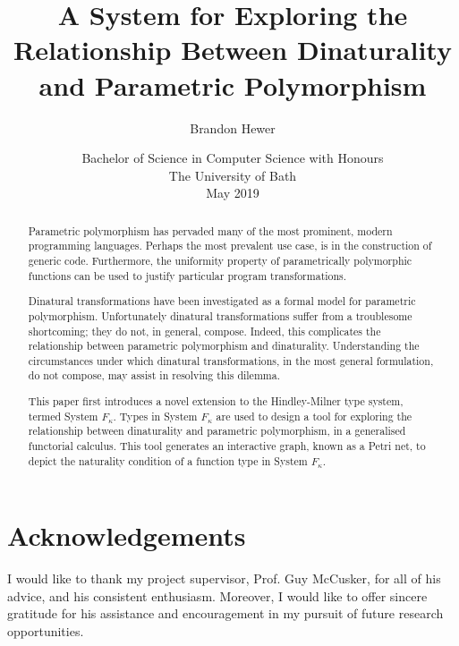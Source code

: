 \documentclass[11pt,openright,hidelinks,a4paper]{article}
\title{A System for Exploring the Relationship Between Dinaturality and Parametric Polymorphism}
\author{Brandon Hewer}
\date{Bachelor of Science in Computer Science with Honours\\The University of Bath\\May 2019}
\begin{document}
\maketitle

\newpage

\newpage


\newpage



\begin{abstract}
Parametric polymorphism has pervaded many of the most prominent, modern programming languages. Perhaps the most prevalent use case, is in the construction of generic code. Furthermore, the uniformity property of parametrically polymorphic functions can be used to justify particular program transformations.
\par 
Dinatural transformations have been investigated as a formal model for parametric polymorphism. Unfortunately dinatural transformations suffer from a troublesome shortcoming; they do not, in general, compose. Indeed, this complicates the relationship between parametric polymorphism and dinaturality. Understanding the circumstances under which dinatural transformations, in the most general formulation, do not compose, may assist in resolving this dilemma.
\par
This paper first introduces a novel extension to the Hindley-Milner type system, termed System $F_\kappa$. Types in System $F_\kappa$ are used to design a tool for exploring the relationship between dinaturality and parametric polymorphism, in a generalised functorial calculus. This tool generates an interactive graph, known as a Petri net, to depict the naturality condition of a function type in System $F_\kappa$.
\end{abstract}
\newpage

\tableofcontents
\newpage
\listoffigures

\newpage

\section*{Acknowledgements}
I would like to thank my project supervisor, Prof. Guy McCusker, for all of his advice, and his consistent enthusiasm. Moreover, I would like to offer sincere gratitude for his assistance and encouragement in my pursuit of future research opportunities.
\newpage
\end{document}
